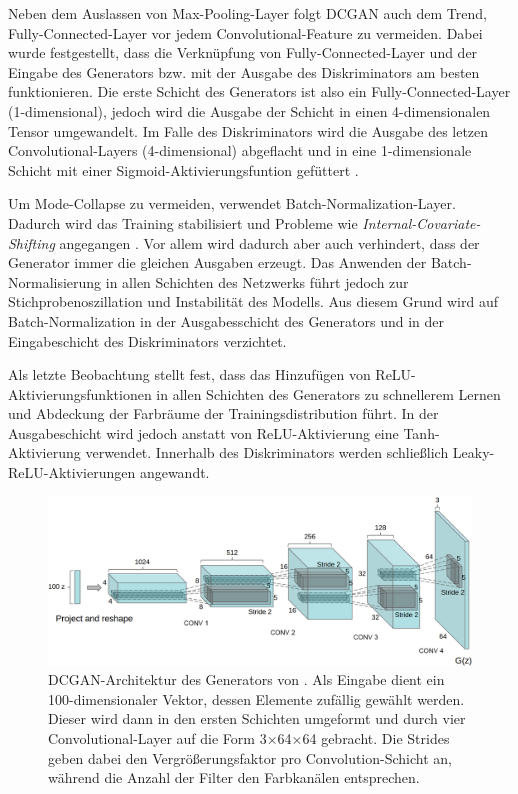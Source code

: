 \documentclass{hsflensburg}
\begin{document}
  Neben dem Auslassen von Max-Pooling-Layer folgt DCGAN auch dem Trend,
  Fully-Connected-Layer vor jedem Convolutional-Feature zu vermeiden. Dabei
  wurde festgestellt, dass die Verknüpfung von Fully-Connected-Layer und der
  Eingabe des Generators bzw. mit der Ausgabe des Diskriminators am besten
  funktionieren. Die erste Schicht des Generators ist also ein
  Fully-Connected-Layer (1-dimensional), jedoch wird die Ausgabe der Schicht in
  einen 4-dimensionalen Tensor umgewandelt. Im Falle des Diskriminators wird die
  Ausgabe des letzen Convolutional-Layers (4-dimensional) abgeflacht und in eine
  1-dimensionale Schicht mit einer Sigmoid-Aktivierungsfuntion gefüttert
  \cite{radford2016unsupervised}.

  Um Mode-Collapse zu vermeiden, verwendet \cite{radford2016unsupervised}
  Batch-Normalization-Layer. Dadurch wird das Training stabilisiert und Probleme
  wie \textit{Internal-Covariate-Shifting} angegangen \cite{pmlr-v37-ioffe15}.
  Vor allem wird dadurch aber auch verhindert, dass der Generator immer die
  gleichen Ausgaben erzeugt. Das Anwenden der Batch-Normalisierung in allen
  Schichten des Netzwerks führt jedoch zur Stichprobenoszillation und
  Instabilität des Modells. Aus diesem Grund wird auf Batch-Normalization in der
  Ausgabesschicht des Generators und in der Eingabeschicht des Diskriminators
  verzichtet.

  Als letzte Beobachtung stellt \cite{radford2016unsupervised} fest, dass das
  Hinzufügen von ReLU-Ak\-ti\-vier\-ungs\-funk\-tio\-nen in allen Schichten des
  Generators zu schnellerem Lernen und Abdeckung der Farbräume der
  Trainingsdistribution führt. In der Ausgabeschicht wird jedoch anstatt von
  ReLU-Aktivierung eine Tanh-Aktivierung verwendet. Innerhalb des Diskriminators
  werden schließlich Leaky-ReLU-Aktivierungen angewandt.

  \begin{figure}
    \includegraphics[width=\textwidth]{images/dcgan-architecture}
    \caption{DCGAN-Architektur des Generators von
    \cite{radford2016unsupervised}. Als Eingabe dient ein 100-dimensionaler
    Vektor, dessen Elemente zufällig gewählt werden. Dieser wird dann in den
    ersten Schichten umgeformt und durch vier Convolutional-Layer auf die Form
    3$\times$64$\times$64 gebracht. Die Strides geben dabei den
    Vergrößerungsfaktor pro Convolution-Schicht an, während die Anzahl der
    Filter den Farbkanälen entsprechen.}
  \end{figure}
\end{document}
